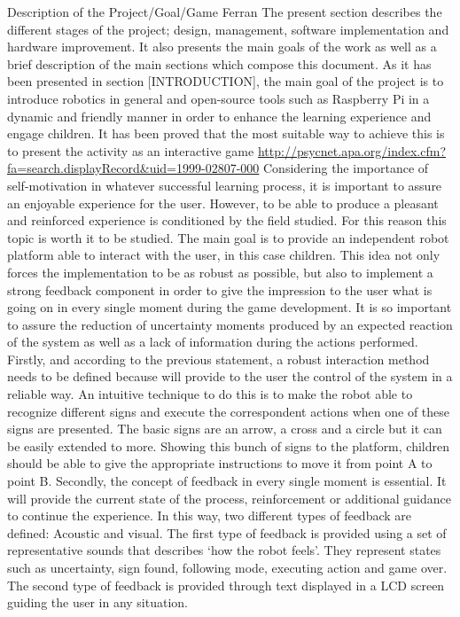 Description of the Project/Goal/Game Ferran
The present section describes the different stages of the project; design, management, software implementation and hardware improvement. It also presents the main goals of the work as well as a brief description of the main sections which compose this document.
As it has been presented in section [INTRODUCTION], the main goal of the project is to introduce robotics in general and open-source tools such as Raspberry Pi in a dynamic and friendly manner in order to enhance the learning experience and engage children. It has been proved that the most suitable way to achieve this is to present the activity as an interactive game
\url{ http://psycnet.apa.org/index.cfm?fa=search.displayRecord&uid=1999-02807-000}
Considering the importance of self-motivation in whatever successful learning process, it is important to assure an enjoyable experience for the user. However, to be able to produce a pleasant and reinforced experience is conditioned by the field studied. For this reason this topic is worth it to be studied.
The main goal is to provide an independent robot platform able to interact with the user, in this case children. This idea not only forces the implementation to be as robust as possible, but also to implement a strong feedback component in order to give the impression to the user what is going on in every single moment during the game development. It is so important to assure the reduction of uncertainty moments produced by an expected reaction of the system as well as a lack of information during the actions performed. 
Firstly, and according to the previous statement, a robust interaction method needs to be defined because will provide to the user the control of the system in a reliable way. An intuitive technique to do this is to make the robot able to recognize different signs and execute the correspondent actions when one of these signs are presented. The basic signs are an arrow, a cross and a circle but it can be easily extended to more. Showing this bunch of signs to the platform, children should be able to give the appropriate instructions to move it from point A to point B.
Secondly, the concept of feedback in every single moment is essential. It will provide the current state of the process, reinforcement or additional guidance to continue the experience. In this way, two different types of feedback are defined: Acoustic and visual. 
The first type of feedback is provided using a set of representative sounds that describes ‘how the robot feels’. They represent states such as uncertainty, sign found, following mode, executing action and game over. The second type of feedback is provided through text displayed in a LCD screen guiding the user in any situation.
